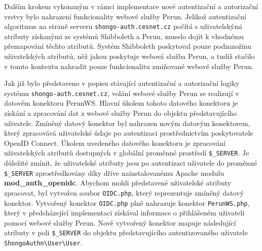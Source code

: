 \documentclass[
  printed, %
  twoside, %
  table,   %
  nolof,     %
  nolot,     %
]{fithesis3}
\begin{document}
\par 
Dalším krokem vykonaným v rámci implementace nové autentizační a autorizační vrstvy bylo nahrazení funkcionality webové služby Perun.  
Jelikož autentizační algoritmus na straně serveru \texttt{shongo-auth.cesnet.cz} počítá s uživatelskými atributy získanými ze systémů Shibboleth a Perun, muselo dojít k vhodnému přemapování těchto atributů. Systém Shibboleth poskytoval pouze podmnožinu uživatelských atributů, něž jakou poskytuje webová služba Perun, a tudíž stačilo v tomto kontextu nahradit pouze funkcionalitu zmiňované webové služby Perun. \par

Jak již bylo představeno v popisu stávající autentizační a autorizační logiky systému \texttt{shongo-auth.cesnet.cz}, volání webové služby Perun se realizují v datovém konektoru PerunWS. Hlavní úkolem tohoto datového konektoru je získání a zpracování dat z webové služby Perun do objektu představujícího uživatele. Zmíněný datový konektor byl nahrazen novým datovým konektorem, který zpracovává uživatelské údaje po autentizaci prostřednictvím poskytovatele OpenID Connect. Úkolem uvedeného datového konektoru je zpracování uživatelských atributů dostupných v globální proměnné prostředí \texttt{\$\_SERVER}. Je důležité zmínit, že uživatelské atributy jsou po autentizaci uživatele do proměnné \texttt{\$\_SERVER} zprostředkovány díky dříve nainstalovanému Apache modulu \textbf{mod\_auth\_openidc}. Abychom mohli představené uživatelské atributy zpracovat, byl vytvořen soubor \texttt{OIDC.php}, který reprezentuje zmíněný datový konektor. Vytvořený konektor \texttt{OIDC.php} plně nahrazuje konektor \texttt{PerunWS.php}, který v předcházející implementaci získával informace o přihlášeném uživateli pomocí webové služby Perun. Nově vytvořený konektor mapuje následující atributy v poli \texttt{\$\_SERVER} do objektu představujícího autentizovaného uživatele \texttt{ShongoAuthn\textbackslash User\textbackslash User}. 
\end{document}
